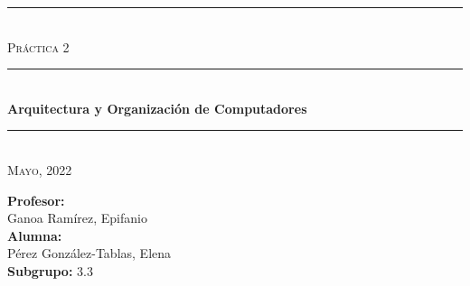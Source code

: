 \begin{titlepage}
	\begin{center}
		\rule{15cm}{0pt} \\
		[3cm]
		\textsc{\Large Práctica 2} \\
		\rule{15cm}{1pt} \\
		[0.25cm]
		\huge{\bfseries Arquitectura y Organización de Computadores} \\
		\rule{15cm}{1pt} \\
		[0.25cm]
		\textsc{\Large Mayo, 2022}\\
		[9cm]
	\end{center}
	\begin{flushright}
		\textbf{Profesor:} \\
		Ganoa Ramírez, Epifanio\\
		[0.25cm]
		\textbf{Alumna:} \\
		Pérez González-Tablas, Elena \\	
		[0.25cm]
		\textbf{Subgrupo:} 3.3 \\
	\end{flushright}
\end{titlepage}
\newpage
\begin{titlepage}
	\begin{flushleft}
	\end{flushleft}
\end{titlepage}